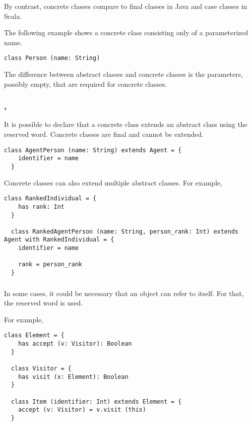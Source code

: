 By contrast, concrete classes compare to final classes in Java and case classes in Scala.

The following example shows a concrete class consisting only of a parameterized name.
\begin{lstlisting}[label={lst:exampleConcreteClass}]
  class Person (name: String)
\end{lstlisting}

The difference between abstract classes and concrete classes is the parameters, possibly empty, that are required for concrete classes.

\subsubsection{\sodaextends, \sodawith}

It is possible to declare that a concrete class extends an abstract class using the \sodaextends reserved word.
Concrete classes are final and cannot be extended.

\begin{lstlisting}[label={lst:exampleExtends}]
  class AgentPerson (name: String) extends Agent = {
    identifier = name
  }
\end{lstlisting}

Concrete classes can also extend multiple abstract classes.
For example,
\begin{lstlisting}[label={lst:exampleWith}]
  class RankedIndividual = {
    has rank: Int
  }

  class RankedAgentPerson (name: String, person_rank: Int) extends Agent with RankedIndividual = {
    identifier = name

    rank = person_rank
  }
\end{lstlisting}

\subsubsection{\sodathis}

In some cases, it could be necessary that an object can refer to itself.
For that, the \sodathis reserved word is used.

For example,
\begin{lstlisting}[label={lst:exampleExtendsElement}]
  class Element = {
    has accept (v: Visitor): Boolean
  }

  class Visitor = {
    has visit (x: Element): Boolean
  }

  class Item (identifier: Int) extends Element = {
    accept (v: Visitor) = v.visit (this)
  }
\end{lstlisting}

